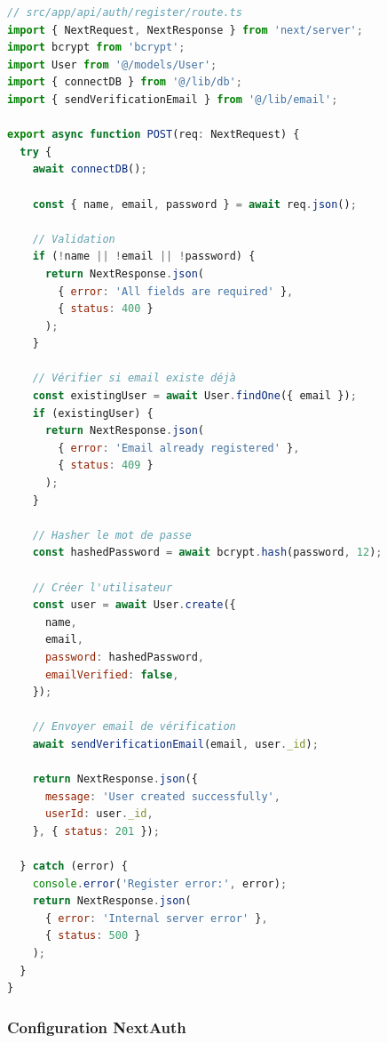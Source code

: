 \begin{lstlisting}[language=JavaScript, caption=API Route d'inscription, label=code:api-register]
// src/app/api/auth/register/route.ts
import { NextRequest, NextResponse } from 'next/server';
import bcrypt from 'bcrypt';
import User from '@/models/User';
import { connectDB } from '@/lib/db';
import { sendVerificationEmail } from '@/lib/email';

export async function POST(req: NextRequest) {
  try {
    await connectDB();
    
    const { name, email, password } = await req.json();
    
    // Validation
    if (!name || !email || !password) {
      return NextResponse.json(
        { error: 'All fields are required' },
        { status: 400 }
      );
    }
    
    // Vérifier si email existe déjà
    const existingUser = await User.findOne({ email });
    if (existingUser) {
      return NextResponse.json(
        { error: 'Email already registered' },
        { status: 409 }
      );
    }
    
    // Hasher le mot de passe
    const hashedPassword = await bcrypt.hash(password, 12);
    
    // Créer l'utilisateur
    const user = await User.create({
      name,
      email,
      password: hashedPassword,
      emailVerified: false,
    });
    
    // Envoyer email de vérification
    await sendVerificationEmail(email, user._id);
    
    return NextResponse.json({
      message: 'User created successfully',
      userId: user._id,
    }, { status: 201 });
    
  } catch (error) {
    console.error('Register error:', error);
    return NextResponse.json(
      { error: 'Internal server error' },
      { status: 500 }
    );
  }
}
\end{lstlisting}

\subsubsection{Configuration NextAuth}


